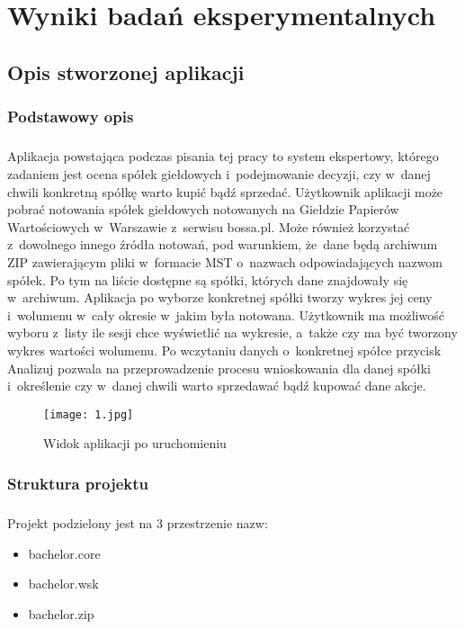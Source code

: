 \chapter{Wyniki badań eksperymentalnych}\label{chap:badania}

\section{Opis stworzonej aplikacji}

\subsection{Podstawowy opis}

\paragraph{}
Aplikacja powstająca podczas pisania tej pracy to system ekspertowy, którego zadaniem jest ocena spółek giełdowych i~podejmowanie decyzji, czy w~danej chwili konkretną spółkę warto kupić bądź sprzedać. Użytkownik aplikacji może pobrać notowania spółek giełdowych notowanych na Giełdzie Papierów Wartościowych w~Warszawie z~serwisu bossa.pl. Może również korzystać z~dowolnego innego źródła notowań, pod warunkiem, że~dane będą archiwum ZIP zawierającym pliki w~formacie MST o~nazwach odpowiadających nazwom spółek. Po tym na liście dostępne są spółki, których dane znajdowały się w~archiwum. Aplikacja po wyborze konkretnej spółki tworzy wykres jej ceny i~wolumenu w~cały okresie w~jakim była notowana. Użytkownik ma możliwość wyboru z~listy ile sesji chce wyświetlić na wykresie, a~także czy ma być tworzony wykres wartości wolumenu. Po wczytaniu danych o~konkretnej spółce przycisk Analizuj pozwala na przeprowadzenie procesu wnioskowania dla danej spółki i~określenie czy w~danej chwili warto sprzedawać bądź kupować dane akcje.

\begin{figure}[H]
	\centering
	\texttt{[image: 1.jpg]}
	\caption{Widok aplikacji po uruchomieniu}
	\label{fig:1}
\end{figure}

\subsection{Struktura projektu}

\paragraph{}
Projekt podzielony jest na 3 przestrzenie nazw:
\begin{itemize}
	\item bachelor.core
	\item bachelor.wsk
	\item bachelor.zip
\end{itemize}

